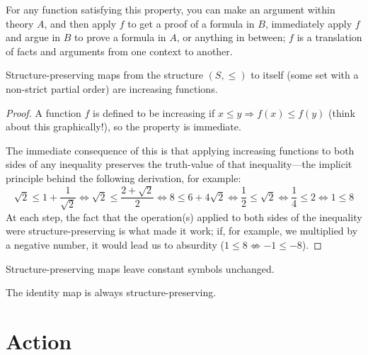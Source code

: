 For any function satisfying this property, you can make an argument within theory $A$, and then apply $f$ to get a proof of a formula in $B$,
immediately apply $f$ and argue in $B$ to prove a formula in $A$, or anything in between;
$f$ is a translation of facts and arguments from one context to another.

\begin{exam}
  Structure-preserving maps from the structure $(S, \leq)$ to itself (some set with a non-strict partial order) are increasing functions.
\end{exam}

\begin{proof}
  A function $f$ is defined to be increasing if $x \leq y \Rightarrow f(x) \leq f(y)$ (think about this graphically!),
  so the property is immediate.

  The immediate consequence of this is that applying increasing functions to both sides of any inequality preserves the truth-value
  of that inequality---the implicit principle behind the following derivation, for example:
  \[
    \sqrt{2} \leq 1 + \frac{1}{\sqrt{2}} \Leftrightarrow \sqrt{2} \leq \frac{2 + \sqrt{2}}{2}
    \Leftrightarrow 8 \leq 6 + 4 \sqrt{2} \Leftrightarrow \frac{1}{2} \leq \sqrt{2} \Leftrightarrow \frac{1}{4} \leq 2
    \Leftrightarrow 1 \leq 8
  \]
  At each step, the fact that the operation(s) applied to both sides of the inequality were structure-preserving is what made it work;
  if, for example, we multiplied by a negative number, it would lead us to absurdity ($1 \leq 8 \not\Leftrightarrow -1 \leq -8$).
\end{proof}

\begin{thm}
  Structure-preserving maps leave constant symbols unchanged.
\end{thm}

\begin{thm}
  The identity map is always structure-preserving.
\end{thm}

\begin{philosophy}
  \label{phil:nothing}
\end{philosophy}

\section{Action}

